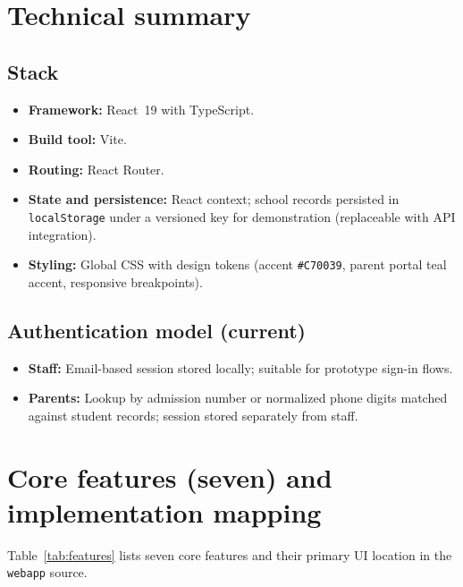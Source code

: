 \documentclass[11pt,a4paper]{article}
\begin{document}
\section{Technical summary}

\subsection{Stack}
\begin{itemize}[leftmargin=*]
  \item \textbf{Framework:} React~19 with TypeScript.
  \item \textbf{Build tool:} Vite.
  \item \textbf{Routing:} React Router.
  \item \textbf{State and persistence:} React context; school records persisted in \texttt{localStorage} under a versioned key for demonstration (replaceable with API integration).
  \item \textbf{Styling:} Global CSS with design tokens (accent \texttt{\#C70039}, parent portal teal accent, responsive breakpoints).
\end{itemize}

\subsection{Authentication model (current)}
\begin{itemize}[leftmargin=*]
  \item \textbf{Staff:} Email-based session stored locally; suitable for prototype sign-in flows.
  \item \textbf{Parents:} Lookup by admission number or normalized phone digits matched against student records; session stored separately from staff.
\end{itemize}

\section{Core features (seven) and implementation mapping}

Table~\ref{tab:features} lists seven core features and their primary UI location in the \texttt{webapp} source.
\end{document}
